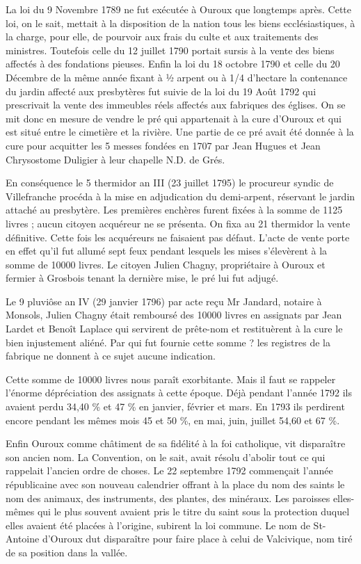 La loi du 9 Novembre 1789 ne fut exécutée à Ouroux que longtemps après. Cette loi, on le sait, mettait à la disposition de la nation tous les biens ecclésiastiques, à la charge, pour elle, de pourvoir aux frais du culte et aux traitements des ministres. Toutefois celle du 12 juillet 1790 portait sursis à la vente des biens affectés à des fondations pieuses. Enfin la loi du 18 octobre 1790 et celle du 20 Décembre de la même année fixant à ½ arpent ou à 1/4 d'hectare la contenance du jardin affecté aux presbytères fut suivie de la loi du 19 Août 1792 qui prescrivait la vente des immeubles réels affectés aux fabriques des églises. On se mit donc en mesure de vendre le
pré qui appartenait à la cure d'Ouroux et qui est situé entre le cimetière et la rivière. Une partie de ce pré avait été donnée à la cure pour acquitter les 5 messes fondées en 1707 par Jean Hugues et Jean Chrysostome Duligier à leur chapelle N.D. de Grés.

En conséquence le 5 thermidor an III (23 juillet 1795) le procureur syndic de Villefranche procéda à la mise en adjudication du demi-arpent, réservant le jardin attaché au presbytère. Les premières enchères furent fixées à la somme de 1125 livres ; aucun citoyen acquéreur ne se présenta. On fixa au 21 thermidor la vente définitive. Cette fois les acquéreurs ne faisaient pas défaut. L'acte de vente porte en effet qu'il fut allumé sept feux pendant lesquels les mises s'élevèrent à la somme de 10000 livres. Le citoyen Julien Chagny, propriétaire à Ouroux et fermier à Grosbois tenant la dernière mise, le pré lui fut adjugé.

Le 9 pluviôse an IV (29 janvier 1796) par acte reçu Mr Jandard, notaire à Monsols, Julien Chagny était remboursé des 10000 livres en assignats par Jean Lardet et Benoît Laplace qui servirent de prête-nom et restituèrent à la cure le bien injustement aliéné. Par qui fut fournie cette somme ? les registres de la fabrique ne donnent à ce sujet aucune indication.

Cette somme de 10000 livres nous paraît exorbitante. Mais il faut se rappeler l'énorme dépréciation des assignats à cette époque. Déjà pendant l'année 1792 ils avaient perdu 34,40 \% et 47 \% en janvier, février et mars. En 1793 ils perdirent encore pendant les mêmes mois 45 et 50 \%, en mai, juin, juillet 54,60 et 67 \%.

Enfin Ouroux comme châtiment de sa fidélité à la foi catholique, vit disparaître son ancien nom. La Convention, on le sait, avait résolu d'abolir tout ce qui rappelait l'ancien ordre de choses. Le 22 septembre 1792 commençait l'année républicaine avec son nouveau calendrier offrant à la place du nom des saints le nom des animaux, des instruments, des plantes, des minéraux. Les paroisses elles-mêmes qui le plus souvent avaient pris le titre du saint sous la protection duquel elles avaient été placées à l'origine, subirent la loi commune. Le nom de St-Antoine d'Ouroux dut disparaître pour faire place à celui de Valcivique, nom tiré de sa position dans la vallée.

